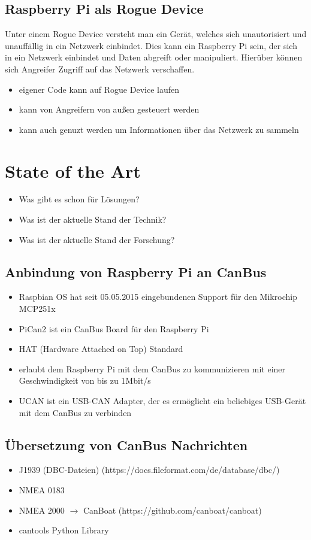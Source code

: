 \subsection{Raspberry Pi als Rogue Device}
Unter einem Rogue Device versteht man ein Gerät, welches sich unautorisiert und unauffällig in ein Netzwerk einbindet. \cite{Scarfone2008}
Dies kann ein Raspberry Pi sein, der sich in ein Netzwerk einbindet und Daten abgreift oder manipuliert. Hierüber können 
sich Angreifer Zugriff auf das Netzwerk verschaffen. 
\begin{itemize}
    \item eigener Code kann auf Rogue Device laufen
    \item kann von Angreifern von außen gesteuert werden
    \item kann auch genuzt werden um Informationen über das Netzwerk zu sammeln
\end{itemize}

\section{State of the Art}
\begin{itemize}
    \item Was gibt es schon für Lösungen?
    \item Was ist der aktuelle Stand der Technik?
    \item Was ist der aktuelle Stand der Forschung?
\end{itemize}
\subsection{Anbindung von Raspberry Pi an CanBus}
\begin{itemize}
    \item Raspbian OS hat seit 05.05.2015 eingebundenen Support für den Mikrochip MCP251x
\end{itemize}
\cite{Salunkhe2016}
\begin{itemize}
    \item PiCan2 ist ein CanBus Board für den Raspberry Pi
    \item HAT (Hardware Attached on Top) Standard
    \item erlaubt dem Raspberry Pi mit dem CanBus zu kommunizieren mit einer Geschwindigkeit von bis zu 1Mbit/s
    \item UCAN ist ein USB-CAN Adapter, der es ermöglicht ein beliebiges USB-Gerät mit dem CanBus zu verbinden
\end{itemize}
\cite{Pant2019}
\subsection{Übersetzung von CanBus Nachrichten}
\begin{itemize}
    \item J1939 (DBC-Dateien) (https://docs.fileformat.com/de/database/dbc/)
    \item NMEA 0183 
    \item NMEA 2000 $\rightarrow$ CanBoat (https://github.com/canboat/canboat)
    \item cantools Python Library 
\end{itemize}